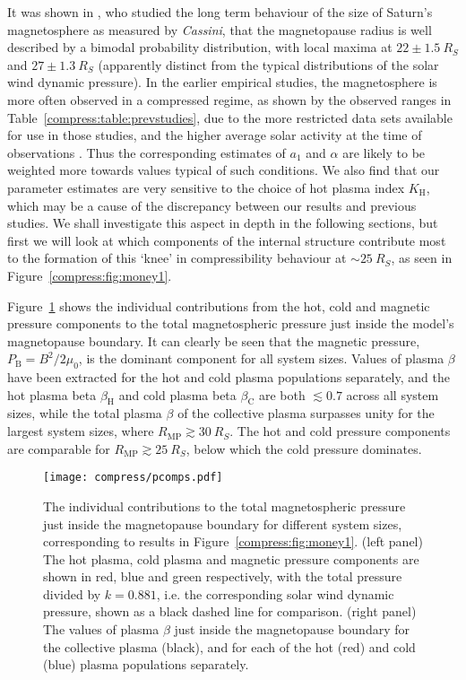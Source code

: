 It was shown in \citet{achilleos2008}, who studied the long term behaviour of the size of Saturn's magnetosphere as measured by \textit{Cassini}, that the magnetopause radius is well described by a bimodal probability distribution, with local maxima at $22 \pm \SI{1.5}{R_S}$ and $27 \pm \SI{1.3}{R_S}$ (apparently distinct from the typical distributions of the solar wind dynamic pressure). In the earlier empirical studies, the magnetosphere is more often observed in a compressed regime, as shown by the observed ranges in Table~\ref{compress:table:prevstudies}, due to the more restricted data sets available for use in those studies, and the higher average solar activity at the time of observations \cite[e.g.][]{hathaway2015}. Thus the corresponding estimates of $a_1$ and $\alpha$ are likely to be weighted more towards values typical of such conditions. We also find that our parameter estimates are very sensitive to the choice of hot plasma index $K_\mathrm{H}$, which may be a cause of the discrepancy between our results and previous studies. We shall investigate this aspect in depth in the following sections, but first we will look at which components of the internal structure contribute most to the formation of this `knee' in compressibility behaviour at ${\sim}\SI{25}{R_S}$, as seen in Figure~\ref{compress:fig:money1}.

Figure~\ref{compress:fig:pcomps} shows the individual contributions from the hot, cold and magnetic pressure components to the total magnetospheric pressure just inside the model's magnetopause boundary. It can clearly be seen that the magnetic pressure, $P_\mathrm{B}=B^2/2\mu_0$, is the dominant component for all system sizes. Values of plasma $\beta$ have been extracted for the hot and cold plasma populations separately, and the hot plasma beta $\beta_\mathrm{H}$ and cold plasma beta $\beta_\mathrm{C}$ are both $\lesssim 0.7$ across all system sizes, while the total plasma $\beta$ of the collective plasma surpasses unity for the largest system sizes, where $R_\mathrm{MP} \gtrsim \SI{30}{R_S}$. The hot and cold pressure components are comparable for $R_\mathrm{MP} \gtrsim \SI{25}{R_S}$, below which the cold pressure dominates. 
\begin{figure}
\centering
\noindent\texttt{[image: compress/pcomps.pdf]}
\caption[Pressure components and plasma $\beta$ just inside the magnetopause boundary for typical $K_\mathrm{H}$.]{The individual contributions to the total magnetospheric pressure just inside the magnetopause boundary for different system sizes, corresponding to results in Figure~\ref{compress:fig:money1}. (left panel) The hot plasma, cold plasma and magnetic pressure components are shown in red, blue and green respectively, with the total pressure divided by $k=0.881$, i.e. the corresponding solar wind dynamic pressure, shown as a black dashed line for comparison. (right panel) The values of plasma $\beta$ just inside the magnetopause boundary for the collective plasma (black), and for each of the hot (red) and cold (blue) plasma populations separately.}
\label{compress:fig:pcomps}
\end{figure}
 
